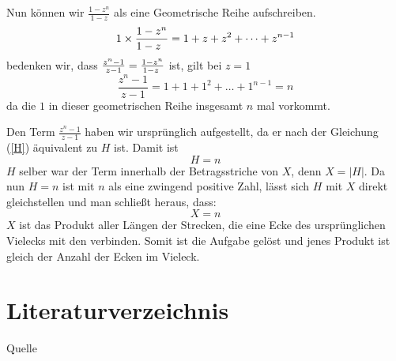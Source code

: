 \documentclass[a4paper,12pt]{article} %
\begin{document}
Nun können wir $\frac{1-z^n}{1-z}$ als eine Geometrische Reihe aufschreiben.
\[1\times\frac{1-z^n}{1-z\hspace{2mm}}=1+z+z^2+\dots+z^{n-1}\]
bedenken wir, dass $\frac{z^n-1}{z-1}=\frac{1-z^n}{1-z\hspace{1mm}}$ ist, gilt bei $z=1$
\[\frac{z^n-1}{z-1}=1+1+1^2+\dots+1^{n-1}=n\]
da die $1$ in dieser geometrischen Reihe insgesamt $n$ mal vorkommt.






Den Term $\frac{z^n-1}{z-1}$ haben wir ursprünglich aufgestellt, da er nach der Gleichung (\ref{H}) äquivalent zu $H$ ist. Damit ist
\[H=n\]
$H$ selber war der Term innerhalb der Betragsstriche von $X$, denn $X=|H|$.
Da nun $H=n$ ist mit $n$ als eine zwingend positive Zahl, lässt sich $H$ mit $X$ direkt gleichstellen und man schließt heraus, dass:
\[X=n\]
$X$ ist das Produkt aller Längen der Strecken, die eine Ecke des ursprünglichen Vielecks mit den verbinden. Somit ist die Aufgabe gelöst und jenes Produkt ist gleich der Anzahl der Ecken im Vieleck.







\section{Literaturverzeichnis}

\renewcommand{\refname}{Literaturverzeichnis}  %

\begin{thebibliography}{9}
	 Quelle
	
\end{thebibliography}
\end{document}
